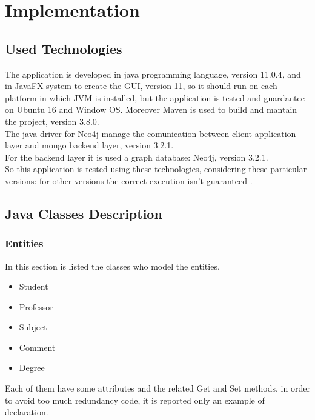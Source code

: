 \documentclass[a4paper]{article}
\begin{document}
\section{Implementation}

\subsection{Used Technologies}
The application is developed in java programming language, version 11.0.4, and in JavaFX system to create the GUI, version 11, so it should run on each platform in which JVM is installed, but the application is tested and guardantee on Ubuntu 16 and Window OS. Moreover Maven is used  to build and mantain the project, version 3.8.0. \\
The java driver for Neo4j manage the comunication between client application layer and mongo backend layer, version 3.2.1.\\ 
For the backend layer it is used a graph database: Neo4j, version 3.2.1.\\
So this application is tested using these technologies, considering these particular versions: for other versions the correct execution isn't guaranteed .\\

\subsection{Java Classes Description}
\subsubsection{Entities}
In this section is listed the classes who model the entities.
\begin{itemize}
\item Student
\item Professor
\item Subject
\item Comment
\item Degree
\end{itemize}
Each of them have some attributes and the related Get and Set methods, in order to avoid too much redundancy code, it is reported only an example of declaration.
\end{document}
